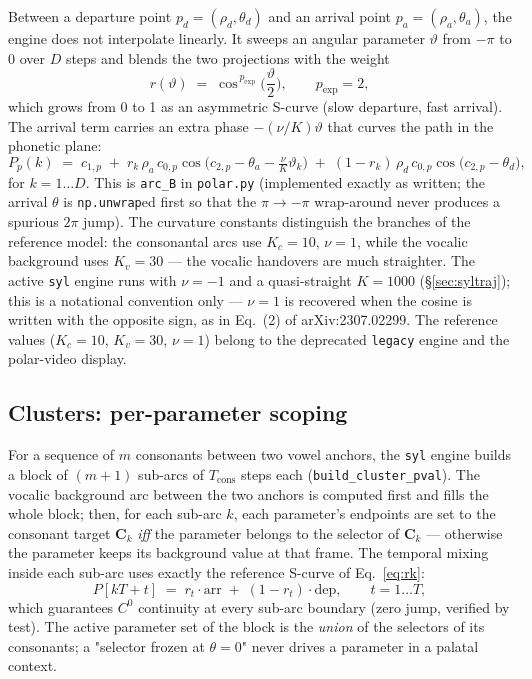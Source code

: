 \documentclass[11pt,a4paper]{article}
\begin{document}
Between a departure point \(p_d = (\rho_d, \theta_d)\) and an arrival
point \(p_a = (\rho_a, \theta_a)\), the engine does not interpolate
linearly. It sweeps an angular parameter \(\vartheta\) from
\(-\pi\) to \(0\) over \(D\) steps and blends the two projections with
the weight
\begin{equation}
r(\vartheta) \;=\; \cos^{\,p_{\mathrm{exp}}}\!\Big(\frac{\vartheta}{2}\Big),
\qquad p_{\mathrm{exp}} = 2,
\label{eq:rk}
\end{equation}
which grows from 0 to 1 as an asymmetric S-curve (slow departure, fast
arrival). The arrival term carries an extra phase \(-(\nu/K)\vartheta\)
that curves the path in the phonetic plane:
\begin{equation}
P_p(k) \;=\; c_{1,p}
\;+\; r_k\, \rho_a\, c_{0,p}
   \cos\!\big(c_{2,p} - \theta_a - \tfrac{\nu}{K}\vartheta_k\big)
\;+\; (1 - r_k)\, \rho_d\, c_{0,p}
   \cos\!\big(c_{2,p} - \theta_d\big),
\label{eq:arc}
\end{equation}
for \(k = 1 \ldots D\). This is \texttt{arc\_B} in
\texttt{polar.py} (implemented exactly as written; the arrival
\(\theta\) is \texttt{np.unwrap}ed first so that the \(\pi \to -\pi\)
wrap-around never produces a spurious \(2\pi\) jump). The curvature
constants distinguish the branches of the reference model: the consonantal
arcs use \(K_c = 10\), \(\nu = 1\), while the vocalic background uses
\(K_v = 30\) --- the vocalic handovers are much straighter. The active
\texttt{syl} engine runs with \(\nu = -1\) and a quasi-straight
\(K = 1000\) (\S\ref{sec:syltraj}); this is a notational convention
only --- \(\nu = 1\) is recovered when the cosine is written with the
opposite sign, as in Eq.~(2) of arXiv:2307.02299. The reference values
(\(K_c = 10\), \(K_v = 30\), \(\nu = 1\)) belong to the deprecated
\texttt{legacy} engine and the polar-video display.

\subsection{Clusters: per-parameter scoping}\label{subsec:clusters}

For a sequence of \(m\) consonants between two vowel anchors, the
\texttt{syl} engine builds a block of \((m+1)\) sub-arcs of
\(T_{\mathrm{cons}}\) steps each
(\texttt{build\_cluster\_pval}). The vocalic background arc between the
two anchors is computed first and fills the whole block; then, for each
sub-arc \(k\), each parameter's endpoints are set to the consonant target
\(\mathbf{C}_k\) \emph{iff} the parameter belongs to the selector of
\(\mathbf{C}_k\) --- otherwise the parameter keeps its background value at
that frame. The temporal mixing inside each sub-arc uses exactly the
reference S-curve of Eq.~\eqref{eq:rk}:
\begin{equation}
P[kT + t] \;=\; r_t \cdot \mathrm{arr} \;+\; (1 - r_t) \cdot \mathrm{dep},
\qquad t = 1 \ldots T,
\label{eq:cluster}
\end{equation}
which guarantees \(C^0\) continuity at every sub-arc boundary (zero jump,
verified by test). The active parameter set of the block is the
\emph{union} of the selectors of its consonants; a "selector frozen at
\(\theta = 0\)" never drives a parameter in a palatal context.
\end{document}
